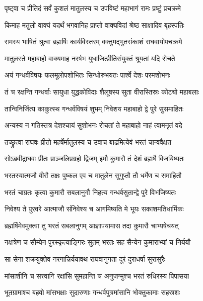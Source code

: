 \twolineshloka
{पृष्ट्वा च प्रीतिदं सर्वं कुशलं मातुलस्य च}
{उपविष्टं महाभागं रामः प्रष्टुं प्रचक्रमे} %

\twolineshloka
{किमाह मतुलो वाक्यं यदर्थं भगवानिह}
{प्राप्तो वाक्यविदां श्रेष्ठ साक्षादिव बृहस्पतिः} %

\twolineshloka
{रामस्य भाषितं श्रुत्वा ब्रह्मर्षिः कार्यविस्तरम्}
{वक्तुमद्भुतसंकाशं राघवायोपचक्रमे} %

\twolineshloka
{मातुलस्ते महाबाहो वाक्यमाह नरर्षभ}
{युधाजित्प्रीतिसंयुक्तं श्रूयतां यदि रोचते} %

\twolineshloka
{अयं गन्धर्वविषयः फलमूलोपशोभितः}
{सिन्धोरुभयतः पार्श्वे देशः परमशोभनः} %

\twolineshloka
{तं च रक्षन्ति गन्धर्वाः सायुधा युद्धकोविदाः}
{शैलूषस्य सुता वीरास्तिस्रः कोट्यो महाबलाः} %

\twolineshloka
{तान्विनिर्जित्य काकुत्स्थ गन्धर्वविषयं शुभम्}
{निवेशय महाबाहो द्वे पुरे सुसमाहितः} %

\twolineshloka
{अन्यस्य न गतिस्तत्र देशश्चायं सुशोभनः}
{रोचतां ते महाबाहो नाहं त्वामनृतं वदे} %

\twolineshloka
{तच्छ्रुत्वा राघवः प्रीतो महर्षेर्मातुलस्य च}
{उवाच बाढमित्येवं भरतं चान्ववैक्षत} %

\twolineshloka
{सोऽब्रवीद्राघवः प्रीतः प्राञ्जलिप्रग्रहो द्विजम्}
{इमौ कुमारौ तं देशं ब्रह्मर्षे विजयिष्यतः} %

\twolineshloka
{भरतस्यात्मजौ वीरौ तक्षः पुष्कल एव च}
{मातुलेन सुगुप्तौ तौ धर्मेण च समाहितौ} %

\twolineshloka
{भरतं चाग्रतः कृत्वा कुमारौ सबलानुगौ}
{निहत्य गन्धर्वसुतान्द्वे पुरे विभजिष्यतः} %

\twolineshloka
{निवेश्य ते पुरवरे आत्माजौ संनिवेश्य च}
{आगमिष्यति मे भूयः सकाशमतिधार्मिकः} %

\twolineshloka
{ब्रह्मर्षिमेवमुक्त्वा तु भरतं सबलानुगम्}
{आज्ञापयामास तदा कुमारौ चाभ्यषेचयत्} %

\twolineshloka
{नक्षत्रेण च सौम्येन पुरस्कृत्याङ्गिरः सुतम्}
{भरतः सह सैन्येन कुमाराभ्यां च निर्ययौ} %

\twolineshloka
{सा सेना शक्रयुक्तेव नरगान्निर्ययावथ}
{राघवानुगता दूरं दुराधर्षा सुरासुरैः} %

\twolineshloka
{मांसाशीनि च सत्त्वानि रक्षांसि सुमहान्ति च}
{अनुजग्मुश्च भरतं रुधिरस्य पिपासया} %

\twolineshloka
{भूतग्रामाश्च बहवो मांसभक्षाः सुदारुणाः}
{गन्धर्वपुत्रमांसानि भोक्तुकामाः सहस्रशः} %

